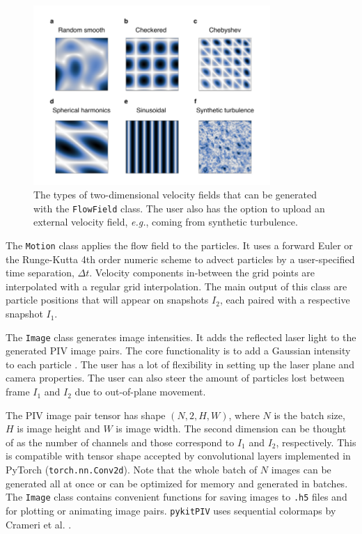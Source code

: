 \documentclass[a4paper,fleqn]{cas-dc}
\begin{document}
\begin{figure}[t]
\centering
\includegraphics[width=9cm]{velocity-fields.pdf}
\caption{The types of two-dimensional velocity fields that can be generated with the \texttt{FlowField} class. The user also has the option to upload an external velocity field, \textit{e.g.}, coming from synthetic turbulence.}
\label{fig:velocity-fields}
\end{figure}

The \texttt{Motion} class applies the flow field to the particles. It uses a forward Euler or the Runge-Kutta 4th order numeric scheme to advect particles by a user-specified time separation, $\Delta t$. Velocity components in-between the grid points are interpolated with a regular grid interpolation. The main output of this class are particle positions that will appear on snapshots $I_2$, each paired with a respective snapshot $I_1$.

The \texttt{Image} class generates image intensities. It adds the reflected laser light to the generated PIV image pairs. The core functionality is to add a Gaussian intensity to each particle \citep{olsen2000out, rabault2017performing}. The user has a lot of flexibility in setting up the laser plane and camera properties. The user can also steer the amount of particles lost between frame $I_1$ and $I_2$ due to out-of-plane movement.

The PIV image pair tensor has shape $(N, 2, H, W)$, where $N$ is the batch size, $H$ is image height and $W$ is image width. The second dimension can be thought of as the number of channels and those correspond to $I_1$ and $I_2$, respectively. This is compatible with tensor shape accepted by convolutional layers implemented in PyTorch (\texttt{torch.nn.Conv2d}). Note that the whole batch of $N$ images can be generated all at once or can be optimized for memory and generated in batches. The \texttt{Image} class contains convenient functions for saving images to \texttt{.h5} files and for plotting or animating image pairs. \texttt{pykitPIV} uses sequential colormaps by Crameri et al. \cite{crameri2020misuse}.
\end{document}
